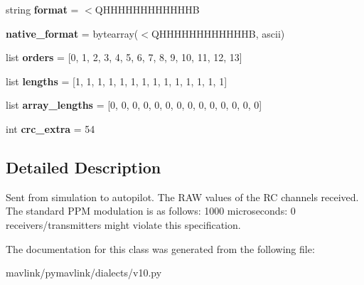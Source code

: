 \begin{DoxyCompactItemize}
\item 
\mbox{\label{classpymavlink_1_1dialects_1_1v10_1_1MAVLink__hil__rc__inputs__raw__message_aa175ea8dd2631f06fbbe7ba7849496aa}} 
string {\bfseries format} = \textquotesingle{}$<$Q\+H\+H\+H\+H\+H\+H\+H\+H\+H\+H\+H\+HB\textquotesingle{}
\item 
\mbox{\label{classpymavlink_1_1dialects_1_1v10_1_1MAVLink__hil__rc__inputs__raw__message_a122ac4bd1ad47112ea8c311cc61d8756}} 
{\bfseries native\+\_\+format} = bytearray(\textquotesingle{}$<$Q\+H\+H\+H\+H\+H\+H\+H\+H\+H\+H\+H\+HB\textquotesingle{}, \textquotesingle{}ascii\textquotesingle{})
\item 
\mbox{\label{classpymavlink_1_1dialects_1_1v10_1_1MAVLink__hil__rc__inputs__raw__message_aac0727ec67179daf394c09dffb8fbb11}} 
list {\bfseries orders} = \mbox{[}0, 1, 2, 3, 4, 5, 6, 7, 8, 9, 10, 11, 12, 13\mbox{]}
\item 
\mbox{\label{classpymavlink_1_1dialects_1_1v10_1_1MAVLink__hil__rc__inputs__raw__message_ab9f52fb12a367e58f4351c130aa5e734}} 
list {\bfseries lengths} = \mbox{[}1, 1, 1, 1, 1, 1, 1, 1, 1, 1, 1, 1, 1, 1\mbox{]}
\item 
\mbox{\label{classpymavlink_1_1dialects_1_1v10_1_1MAVLink__hil__rc__inputs__raw__message_af8e3d2094558db1aaeb6136524085144}} 
list {\bfseries array\+\_\+lengths} = \mbox{[}0, 0, 0, 0, 0, 0, 0, 0, 0, 0, 0, 0, 0, 0\mbox{]}
\item 
\mbox{\label{classpymavlink_1_1dialects_1_1v10_1_1MAVLink__hil__rc__inputs__raw__message_a730a72de14ae8fa296b695a24aa1d466}} 
int {\bfseries crc\+\_\+extra} = 54
\end{DoxyCompactItemize}


\subsection{Detailed Description}
\begin{DoxyVerb}Sent from simulation to autopilot. The RAW values of the RC
channels received. The standard PPM modulation is as follows:
1000 microseconds: 0%
receivers/transmitters might violate this specification.
\end{DoxyVerb}
 

The documentation for this class was generated from the following file\+:\begin{DoxyCompactItemize}
\item 
mavlink/pymavlink/dialects/v10.\+py\end{DoxyCompactItemize}
